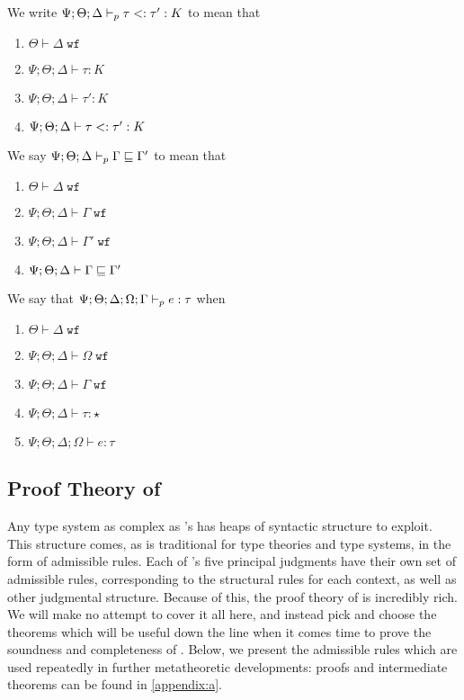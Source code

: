 \begin{definition}
We write $\Psi ; \Theta ; \Delta \vdash_p \tau <: \tau' : K$ to mean that
\begin{enumerate}
  \item $\Theta \vdash \Delta \; \texttt{wf}$
  \item $\Psi ; \Theta ; \Delta \vdash \tau : K$
  \item $\Psi ; \Theta ; \Delta \vdash \tau' : K$
  \item $\Psi ; \Theta ; \Delta \vdash \tau <: \tau' : K$
\end{enumerate}
\end{definition}

\begin{definition}
We say $\Psi ; \Theta ; \Delta \vdash_p \Gamma \sqsubseteq \Gamma'$ to mean that
\begin{enumerate}
  \item $\Theta \vdash \Delta \; \texttt{wf}$
  \item $\Psi ; \Theta ; \Delta \vdash \Gamma \; \texttt{wf}$
  \item $\Psi ; \Theta ; \Delta \vdash \Gamma' \; \texttt{wf}$
  \item $\Psi ; \Theta ; \Delta \vdash \Gamma \sqsubseteq \Gamma'$
\end{enumerate}
\end{definition}

\begin{definition}
We say that $\Psi ; \Theta ; \Delta ; \Omega ; \Gamma \vdash_p e : \tau$ when
\begin{enumerate}
  \item $\Theta \vdash \Delta \; \texttt{wf}$
  \item $\Psi ; \Theta ; \Delta \vdash \Omega \; \texttt{wf}$
  \item $\Psi ; \Theta ; \Delta \vdash \Gamma \; \texttt{wf}$
  \item $\Psi ; \Theta ; \Delta \vdash \tau : \star$
  \item $\Psi ; \Theta ; \Delta ; \Omega \vdash e : \tau$
\end{enumerate}
\end{definition}

\subsection{Proof Theory of \dlambdaamor}
Any type system as complex as \dlambdaamor's has heaps of syntactic structure to exploit. This structure comes, as is traditional for type theories and type systems, in the form of admissible rules. Each of \dlambdaamor's five principal judgments have their own set of admissible rules, corresponding to the structural rules for each context, as well as other judgmental structure. Because of this, the proof theory of \dlambdaamor is incredibly rich. We will make no attempt to cover it all here, and instead pick and choose the theorems which will be useful down the line when it comes time to prove the soundness and completeness of \bilambdaamor. Below, we present the admissible rules which are used repeatedly in further metatheoretic developments: proofs and intermediate theorems can be found in \autoref{appendix:a}.

